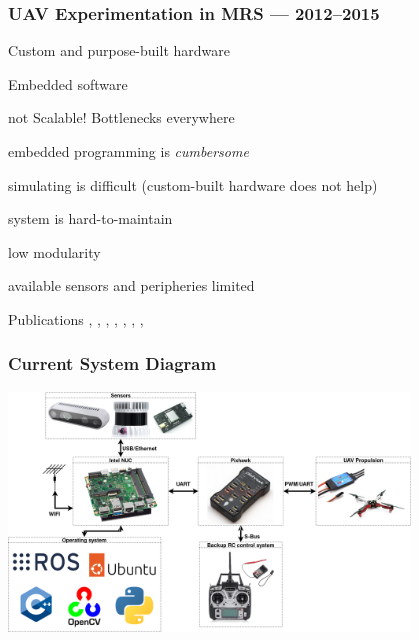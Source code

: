 \documentclass[aspectratio=169]{beamer}
\begin{document}
\begin{frame}
  \frametitle{UAV Experimentation in MRS --- 2012--2015}

  \begin{itemize}
    \item Custom and purpose-built hardware
    \item Embedded software
    {\color{red} \item not Scalable! Bottlenecks everywhere
    \item embedded programming is \emph{cumbersome}
    \item simulating is difficult (custom-built hardware does not help)
    \item system is hard-to-maintain
    \item low modularity
    \item available sensors and peripheries limited}
  \end{itemize}

  \begin{block}{Publications}
    \cite{saska2013adhoc}, \cite{chudoba2014localization}, \cite{baca2016embedded}, \cite{saska2017documentation}, \cite{chudoba2016exploration}, \cite{saska2016formations}, \cite{spurny2016complex}, \cite{saska2017system}
  \end{block}

\end{frame}



\begin{frame}
\frametitle{Current System Diagram}

\begin{center}
  \includegraphics[width=0.8\textwidth]{./fig/new_diagram.png}
\end{center}

\end{frame}
\end{document}
